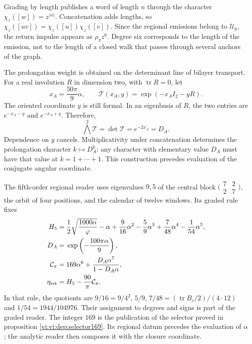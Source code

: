 Grading by length publishes a word of length \(n\)
through the character \(\chi_z([w])=z^{|w|}\). Concatenation
adds lengths, so
\(\chi_z([uv])=\chi_z([u])\chi_z([v])\). Since the regional
emissions belong to \(\mathcal U_6\), the return impulse
appears as \(\rho_\pi z^6\). Degree six corresponds to the
length of the emission, not to the length of a closed walk that
passes through several anchors of the graph.

The prolongation weight is obtained on the determinant line of
bilayer transport. For a real involution \(R\) in dimension two,
with \(\operatorname{tr}R=0\), let
\[
 x_A=\frac{50\pi}{9}\alpha,\qquad
 \mathcal T(x_A,y)=\exp(-x_AI_2-yR).
\]
The oriented coordinate \(y\) is still formal. In an eigenbasis
of \(R\), the two entries are \(e^{-x_A-y}\) and
\(e^{-x_A+y}\). Therefore,
\[
 \bigwedge^2\mathcal T=\det\mathcal T
 =e^{-2x_A}=D_A.
\]
Dependence on \(y\) cancels. Multiplicativity under
concatenation determines the prolongation character \(k\mapsto D_A^k\):
any character with elementary value \(D_A\) must have that value
at \(k=1+\cdots+1\). This construction precedes evaluation
of the conjugate angular coordinate.

The fifth-order regional reader uses eigenvalues \(9,5\)
of the central block \(\bigl(\begin{smallmatrix}7&2\\2&7\end{smallmatrix}\bigr)\),
the orbit of four positions, and the calendar of twelve windows.
Its graded rule fixes
\begin{align}
 H_5={}&\frac12\sqrt{\frac{1000\alpha}{\varphi}}-\alpha
       +\frac9{16}\alpha^2-\frac59\alpha^3
       +\frac7{48}\alpha^4-\frac1{54}\alpha^5,\notag\\
 D_A={}&\exp\left(-\frac{100\pi\alpha}{9}\right),\notag\\
 \mathcal C_\pi={}&169\alpha^6+
                  \frac{D_A\alpha^7}{1-D_A\alpha},\notag\\
 \eta_{\rm ret}={}&H_5-\frac{90}{\pi}\mathcal C_\pi.
 \label{vi:vi:dep:mantisas}
\end{align}
In that rule, the quotients are
\(9/16=9/4^2\), \(5/9\), \(7/48=(\operatorname{tr}B_c/2)/(4\cdot12)\)
and \(1/54=1944/104976\). Their assignment to degrees and signs
is part of the graded reader. The integer \(169\) is the publication
of the selector proved in proposition \ref{vi:vi:dep:selector169}.
Its regional datum precedes the evaluation of \(\alpha\); the
analytic reader then composes it with the closure coordinate.

